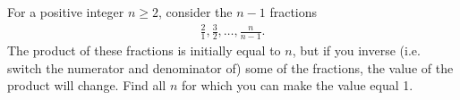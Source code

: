 For a positive integer $n\geq 2$, consider the $n-1$ fractions 
\begin{align*}
    \frac{2}{1}, \frac{3}{2}, \ldots , \frac{n}{n-1}.
\end{align*}  
The product of these fractions is initially equal to $n$, but if you inverse (i.e. switch the numerator and denominator of) some of the fractions, the value of the product will change. Find all $n$ for which you can make the value equal 1. 